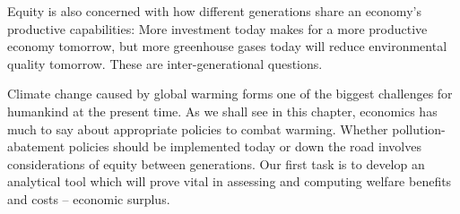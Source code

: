 Equity is also concerned with how different generations share an economy's
productive capabilities: More investment today makes for a more productive
economy tomorrow, but more greenhouse gases today will reduce environmental
quality tomorrow. These are inter-generational questions.

Climate change caused by global warming forms one of the biggest challenges
for humankind at the present time. As we shall see in this chapter,
economics has much to say about appropriate policies to combat warming.
Whether pollution-abatement policies should be implemented today or down the
road involves considerations of equity between generations. Our first task
is to develop an analytical tool which will prove vital in assessing and
computing welfare benefits and costs -- economic surplus.